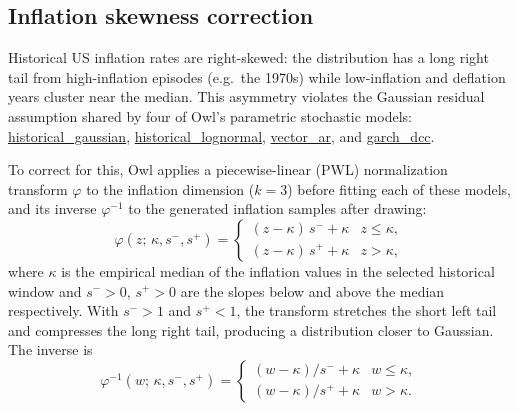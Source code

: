 \documentclass[fleqn,12pt]{report}
\newcommand{\code}[1]{\url{#1}}
\begin{document}
\subsection{Inflation skewness correction}
\label{Sec:InflationSkew}
\label{sec:inflation-pwl}

Historical US inflation rates are right-skewed: the distribution
has a long right tail from high-inflation episodes (e.g.\ the 1970s) while
low-inflation and deflation years cluster near the median.
This asymmetry violates the Gaussian residual assumption shared by four of
Owl's parametric stochastic models: \code{historical_gaussian},
\code{historical_lognormal}, \code{vector_ar}, and \code{garch_dcc}.

To correct for this, Owl applies a piecewise-linear (PWL) normalization
transform $\varphi$ to the inflation dimension ($k = 3$) before fitting
each of these models, and its inverse $\varphi^{-1}$ to the generated
inflation samples after drawing:
\begin{equation}
    \varphi(z;\,\kappa,s^-,s^+) = \begin{cases}
        (z - \kappa)\,s^- + \kappa & z \le \kappa, \\[2pt]
        (z - \kappa)\,s^+ + \kappa & z > \kappa,
    \end{cases}
    \label{Eq:pwl}
\end{equation}
where $\kappa$ is the empirical median of the inflation values in the selected
historical window and $s^- > 0$, $s^+ > 0$ are the slopes below and above the
median respectively.
With $s^- > 1$ and $s^+ < 1$, the transform stretches the short left tail and
compresses the long right tail, producing a distribution closer to Gaussian.
The inverse is
\begin{equation}
    \varphi^{-1}(w;\,\kappa,s^-,s^+) = \begin{cases}
        (w - \kappa)/s^- + \kappa & w \le \kappa, \\[2pt]
        (w - \kappa)/s^+ + \kappa & w > \kappa.
    \end{cases}
    \label{Eq:pwlinv}
\end{equation}
\end{document}
